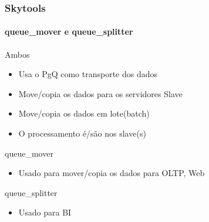 \documentclass{beamer}
\begin{document}
\begin{frame}
    \frametitle{\textbf{Skytools}}
    \framesubtitle{queue\_mover e queue\_splitter}
       \begin{block}{Ambos}
         \begin{itemize}
	   \item Usa o PgQ como transporte dos dados
	   \item Move/copia os dados para os servidores Slave
	   \item Move/copia os dados em lote(batch)
	   \item O processamento é/são nos slave(s)
	 \end{itemize}

       \end{block}
       
       \begin{block}{queue\_mover}
         \begin{itemize}
	   \item Usado para mover/copia os dados para OLTP, Web
 	 \end{itemize}
       \end{block}

       \begin{block}{queue\_splitter}
          \begin{itemize}
	    \item Usado para BI
	 \end{itemize}

        \end{block}
      
\end{frame}
\end{document}
